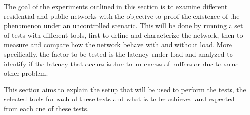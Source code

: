 The goal of the experiments outlined in this section is to examine different
residential and public networks with the objective to proof the existence of the
phenomenon under an uncontrolled scenario. This will be done by running a set of
tests with different tools, first to define and characterize the network, then
to measure and compare how the network behave with and without load. More
specifically, the factor to be tested is the latency under load and analyzed to
identify if the latency that occurs is due to an excess of buffers or due to
some other problem.

This section aims to explain the setup that will be used to perform the tests,
the selected tools for each of these tests and what is to be achieved and 
expected from each one of these tests.
